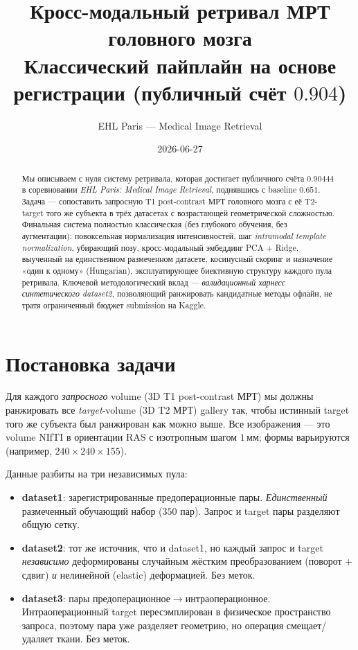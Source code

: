 \documentclass[11pt]{article}
\title{\textbf{Кросс-модальный ретривал МРТ головного мозга}\\[2pt]
\large Классический пайплайн на основе регистрации (публичный счёт $0.904$)}
\author{EHL Paris --- Medical Image Retrieval}
\date{2026-06-27}
\begin{document}
\maketitle

\begin{abstract}
Мы описываем с нуля систему ретривала, которая достигает публичного счёта
$0.90444$ в соревновании \emph{EHL Paris: Medical Image Retrieval}, поднявшись с
baseline $0.651$. Задача — сопоставить запросную T1 post-contrast МРТ головного
мозга с её T2-target того же субъекта в трёх датасетах с возрастающей
геометрической сложностью. Финальная система полностью классическая (без глубокого
обучения, без аугментации): повоксельная нормализация интенсивностей, шаг
\emph{intramodal template normalization}, убирающий позу, кросс-модальный эмбеддинг
PCA + Ridge, выученный на единственном размеченном датасете, косинусный скоринг и
назначение «один к одному» (Hungarian), эксплуатирующее биективную структуру каждого
пула ретривала. Ключевой методологический вклад — \emph{валидационный харнесс
синтетического dataset2}, позволяющий ранжировать кандидатные методы офлайн, не тратя
ограниченный бюджет submission на Kaggle.
\end{abstract}

\tableofcontents

\section{Постановка задачи}

Для каждого \emph{запросного} volume (3D T1 post-contrast МРТ) мы должны ранжировать
все \emph{target}-volume (3D T2 МРТ) gallery так, чтобы истинный target того же
субъекта был ранжирован как можно выше. Все изображения — это volume NIfTI в
ориентации RAS с изотропным шагом $1\,\text{мм}$; формы варьируются (например,
$240\times240\times155$).

Данные разбиты на три независимых пула:
\begin{itemize}[nosep]
  \item \textbf{dataset1}: зарегистрированные предоперационные пары. \emph{Единственный}
        размеченный обучающий набор ($350$ пар). Запрос и target пары разделяют общую сетку.
  \item \textbf{dataset2}: тот же источник, что и dataset1, но каждый запрос и target
        \emph{независимо} деформированы случайным жёстким преобразованием (поворот +
        сдвиг) \emph{и} нелинейной (elastic) деформацией. Без меток.
  \item \textbf{dataset3}: пары предоперационное$\to$интраоперационное. Интраоперационный
        target пересэмплирован в физическое пространство запроса, поэтому пара уже
        разделяет геометрию, но операция смещает/удаляет ткани. Без меток.
\end{itemize}
\end{document}
